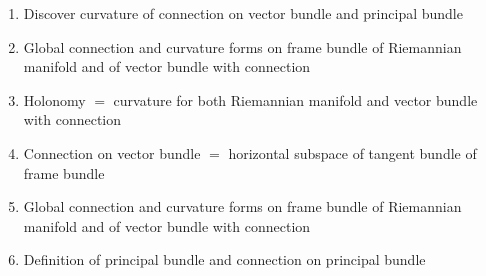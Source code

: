 \documentclass{math-deane}
\begin{document}
\begin{enumerate}
\item Discover curvature of connection on vector bundle and principal bundle
\item Global connection and curvature forms on frame bundle of Riemannian manifold and of vector bundle with connection
\item Holonomy $=$ curvature for both Riemannian manifold and vector bundle with connection
\item Connection on vector bundle $=$ horizontal subspace of tangent bundle of frame bundle
\item Global connection and curvature forms on frame bundle of Riemannian manifold and of vector bundle with connection
\item Definition of principal bundle and connection on principal bundle
\end{enumerate}
\end{document}
